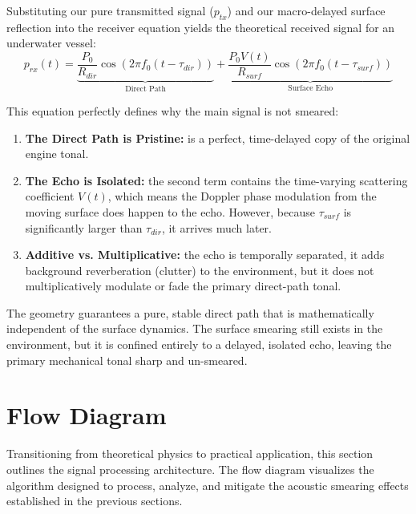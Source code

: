 \documentclass{article}
\begin{document}
Substituting our pure transmitted signal ($p_{tx}$) and our macro-delayed surface reflection into the receiver equation yields the theoretical received signal for an underwater vessel:
\begin{equation}
p_{rx}(t) = \underbrace{ \frac{P_0}{R_{dir}} \cos(2\pi f_0 (t - \tau_{dir})) }_{\text{Direct Path}} + \underbrace{ \frac{P_0 V(t)}{R_{surf}} \cos(2\pi f_0 (t - \tau_{surf})) }_{\text{Surface Echo}}
\end{equation}

This equation perfectly defines why the main signal is not smeared:
\begin{enumerate}
    \item \textbf{The Direct Path is Pristine:} is a perfect, time-delayed copy of the original engine tonal.
    \item \textbf{The Echo is Isolated:} the second term contains the time-varying scattering coefficient $V(t)$, which means the Doppler phase modulation from the moving surface does happen to the echo. However, because $\tau_{surf}$ is significantly larger than $\tau_{dir}$, it arrives much later.
    \item \textbf{Additive vs. Multiplicative:} the echo is temporally separated, it adds background reverberation (clutter) to the environment, but it does not multiplicatively modulate or fade the primary direct-path tonal.
\end{enumerate}

The geometry guarantees a pure, stable direct path that is mathematically independent of the surface dynamics. The surface smearing still exists in the environment, but it is confined entirely to a delayed, isolated echo, leaving the primary mechanical tonal sharp and un-smeared.


\clearpage
\section{Flow Diagram}
Transitioning from theoretical physics to practical application, this section outlines the signal processing architecture. The flow diagram visualizes the algorithm designed to process, analyze, and mitigate the acoustic smearing effects established in the previous sections.
\end{document}
